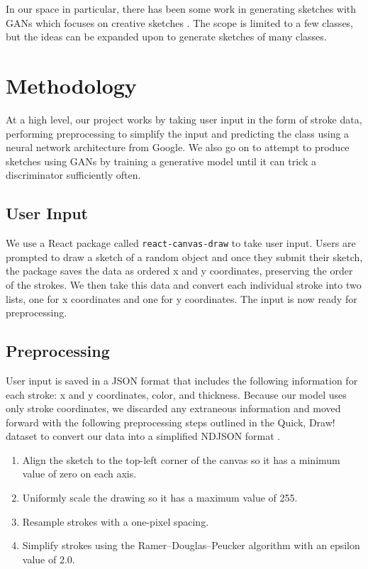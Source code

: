 \documentclass[10pt,twocolumn,letterpaper]{article}
\def\code#1{\texttt{#1}}
\begin{document}
In our space in particular, there has been some work in generating sketches with GANs which focuses on creative sketches \cite{ge2020creative}. The scope is limited to a few classes, but the ideas can be expanded upon to generate sketches of many classes.

\section{Methodology}

At a high level, our project works by taking user input in the form of stroke data, performing preprocessing to simplify the input and predicting the class using a neural network architecture from Google. We also go on to attempt to produce sketches using GANs by training a generative model until it can trick a discriminator sufficiently often.

\subsection{User Input}

We use a React package called \code{react-canvas-draw} \cite{react-canvas} to take user input. Users are prompted to draw a sketch of a random object and once they submit their sketch, the package saves the data as ordered x and y coordinates, preserving the order of the strokes. We then take this data and convert each individual stroke into two lists, one for x coordinates and one for y coordinates. The input is now ready for preprocessing.

\subsection{Preprocessing}

User input is saved in a JSON format that includes the following information for each stroke: x and y coordinates, color, and thickness. Because our model uses only stroke coordinates, we discarded any extraneous information and moved forward with the following preprocessing steps outlined in the Quick, Draw! dataset to convert our data into a simplified NDJSON format \cite{QuickDraw}.

\begin{enumerate}
  \item Align the sketch to the top-left corner of the canvas so it has a minimum value of zero on each axis.
  \item Uniformly scale the drawing so it has a maximum value of 255.
  \item Resample strokes with a one-pixel spacing.
  \item Simplify strokes using the Ramer–Douglas–Peucker algorithm with an epsilon value of 2.0.
\end{enumerate}
\end{document}
